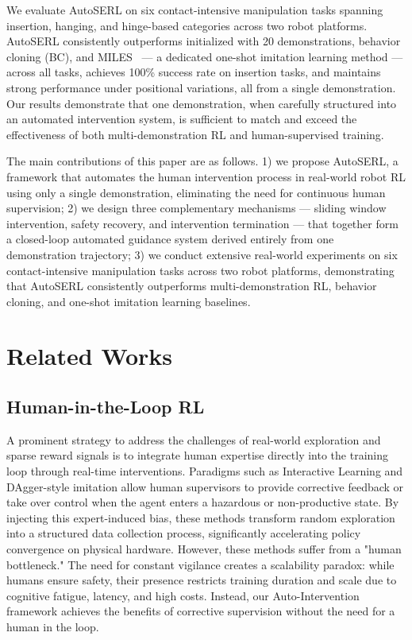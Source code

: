 \documentclass[runningheads]{llncs}
\begin{document}
We evaluate AutoSERL on six contact-intensive manipulation tasks spanning 
insertion, hanging, and hinge-based categories across two robot platforms. 
AutoSERL consistently outperforms \cite{luo2024serl} initialized with 20 
demonstrations, behavior cloning (BC), and MILES~\cite{papagiannis2024miles} --- a dedicated one-shot imitation learning method --- across all tasks, achieves 100\% success rate on insertion tasks, and maintains strong performance under positional variations, all from a single demonstration. Our results demonstrate that one demonstration, when 
carefully structured into an automated intervention system, is sufficient to match and exceed the effectiveness of both multi-demonstration RL and human-supervised training.

The main contributions of this paper are as follows. 1) we propose AutoSERL, a framework that automates the human intervention process in real-world robot RL using only a single demonstration, eliminating the need for continuous human supervision; 2) we design three complementary mechanisms --- sliding window intervention, safety recovery, and intervention termination --- that together form a closed-loop automated guidance system derived entirely from one demonstration trajectory; 3) we conduct extensive real-world experiments on six contact-intensive manipulation tasks across two robot platforms, demonstrating that AutoSERL consistently outperforms multi-demonstration RL, behavior cloning, and one-shot imitation learning baselines.


\section{Related Works}

\subsection{Human-in-the-Loop RL}
A prominent strategy to address the challenges of real-world exploration and sparse reward signals is to integrate human expertise directly into the training loop through real-time interventions. Paradigms such as Interactive Learning\cite{chen2025conrftreinforcedfinetuningmethod,liu2023robotlearningjobhumanintheloop,mandlekar2020humanintheloopimitationlearningusing,wu2025robocopilothumanintheloopinteractiveimitation} and DAgger-style imitation\cite{xu2025compliantresidualdaggerimproving,hoque2021thriftydaggerbudgetawarenoveltyrisk,kelly2019hgdaggerinteractiveimitationlearning,ross2011reductionimitationlearningstructured} allow human supervisors to provide corrective feedback or take over control when the agent enters a hazardous or non-productive state. By injecting this expert-induced bias, these methods transform random exploration into a structured data collection process, significantly accelerating policy convergence on physical hardware.
However, these methods suffer from a "human bottleneck." The need for constant vigilance creates a scalability paradox: while humans ensure safety, their presence restricts training duration and scale due to cognitive fatigue, latency, and high costs. Instead, our Auto-Intervention framework achieves the benefits of corrective supervision without the need for a human in the loop.
\end{document}
